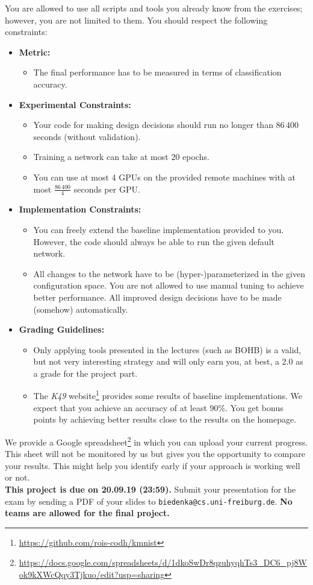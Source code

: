 \documentclass[10pt,a4paper]{article}
\newcommand{\duedate}{20.09.19 (23:59)}
\newcommand{\due}{{\bf This project is due on \duedate.} }
\begin{document}
		You are allowed to use all scripts and tools you already know from the exercises; however, you are not limited to them.
		\newpage\noindent
		You should respect the following constraints:
		\begin{itemize}
			\item \textbf{Metric:}
			\begin{itemize}
				\item The final performance has to be measured in terms of classification accuracy.\\
			\end{itemize}
			\item \textbf{Experimental Constraints:}
			\begin{itemize}
				\item Your code for making design decisions should run no longer than $86\,400$ seconds (without validation).
				\item Training a network can take at most 20 epochs.
				\item You can use at most 4 GPUs on the provided remote machines with at most $\frac{86\,400}{4}$ seconds per GPU.
			\end{itemize}
			\item \textbf{Implementation Constraints:}
			\begin{itemize}
			  \item You can freely extend the baseline implementation provided to you. However, the code should always be able to run the given default network.
			  \item All changes to the network have to be (hyper-)parameterized in the given configuration space. You are not allowed to use manual tuning to achieve better performance. All improved design decisions have to be made (somehow) automatically.
			\end{itemize}
			\item \textbf{Grading Guidelines:}
			\begin{itemize}
			  \item Only applying tools presented in the lectures (such as BOHB) is a valid, but not very interesting strategy and will only earn you, at best, a 2.0 as a grade for the
			  project part.
			  \item The \textit{K49} website\footnote{\url{https://github.com/rois-codh/kmnist}} provides some results of baseline implementations. We expect that you achieve an accuracy of at least $90\%$. You get bonus points by achieving better results close to the results on the homepage.
			\end{itemize}
		\end{itemize}
		
		We provide a Google spreadsheet\footnote{\url{https://docs.google.com/spreadsheets/d/1dkoSwDr8qzuhyqhTs3_DC6_pj8Wok9kXWcQqy3Tjkuo/edit?usp=sharing}} in which you can upload your current progress. This sheet will not be monitored by us but gives you the opportunity to compare your results. This might help you identify early if your approach is working well or not.
\vspace*{\fill}\\
\noindent
\due Submit your presentation for the exam by sending a PDF of your slides to \texttt{biedenka@cs.uni-freiburg.de}. \textbf{No teams are allowed for the final project.}
\end{document}
